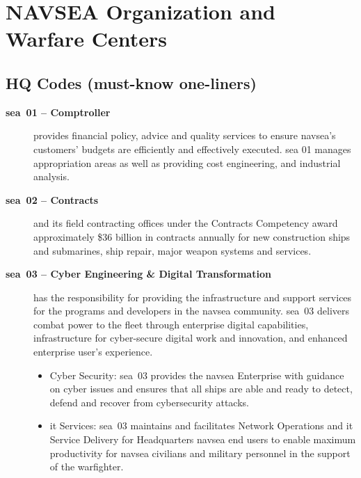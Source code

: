 \documentclass[../src/main.tex]{subfiles}
\begin{document}

\section{NAVSEA Organization and Warfare Centers}
\subsection{HQ Codes (must-know one-liners)}

\begin{description}
  \item[\textbf{\ac{sea}~01 -- Comptroller}] provides financial policy, advice and quality services to ensure \ac{navsea}'s customers' budgets are efficiently and effectively executed. \ac{sea} 01 manages appropriation areas as well as providing cost engineering, and industrial analysis.
  \item[\textbf{\ac{sea}~02 -- Contracts}] and its field contracting offices under the Contracts Competency award approximately \$36 billion in contracts annually for new construction ships and submarines, ship repair, major weapon systems and services.
  \item[\textbf{\ac{sea}~03 -- Cyber Engineering \& Digital Transformation}] has the responsibility for providing the infrastructure and support services for the programs and developers in the \ac{navsea} community. \ac{sea}~03 delivers combat power to the fleet through enterprise digital capabilities, infrastructure for cyber-secure digital work and innovation, and enhanced enterprise user's experience. 
  \begin{itemize}
    \item Cyber Security: \ac{sea}~03 provides the \ac{navsea} Enterprise with guidance on cyber issues and ensures that all ships are able and ready to detect, defend and recover from cybersecurity attacks.
    \item \ac{it} Services: \ac{sea}~03 maintains and facilitates Network Operations and \ac{it} Service Delivery for Headquarters \ac{navsea} end users to enable maximum productivity for \ac{navsea} civilians and military personnel in the support of the warfighter.

\end{itemize}
\end{description}
\end{document}
